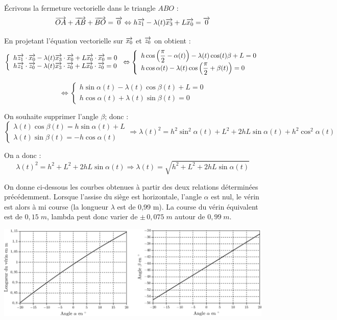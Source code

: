 \documentclass[10pt]{article}
\begin{document}
\begin{corrige}
Écrivons la fermeture vectorielle dans le triangle $ABO$ :
$$
\overrightarrow{OA} + \overrightarrow{AB} + \overrightarrow{BO} = \overrightarrow{0}  \Leftrightarrow  
h\overrightarrow{z_1} - \lambda(t) \overrightarrow{x_3} + L\overrightarrow{x_0} = \overrightarrow{0}
$$

En projetant l'équation vectorielle sur $\overrightarrow{x_0}$ et $\overrightarrow{z_0}$ on obtient : 
$$
\left\{
\begin{array}{l}
h\overrightarrow{z_1}\cdot\overrightarrow{x_0} - \lambda(t) \overrightarrow{x_3}\cdot\overrightarrow{x_0} + L\overrightarrow{x_0}\cdot\overrightarrow{x_0} = 0 \\
h\overrightarrow{z_1}\cdot\overrightarrow{z_0} - \lambda(t) \overrightarrow{x_3}\cdot\overrightarrow{z_0} + L\overrightarrow{x_0}\cdot\overrightarrow{z_0} = 0
\end{array}
\right.
\Leftrightarrow
\left\{
\begin{array}{l}
h\cos\left(\dfrac{\pi}{2} - \alpha(t)\right) - \lambda(t) \cos(t)\beta + L = 0 \\
h\cos\alpha(t) - \lambda(t) \cos\left(\dfrac{\pi}{2} + \beta(t)\right)  = 0
\end{array}
\right.
$$

$$
\Leftrightarrow
\left\{
\begin{array}{l}
h\sin \alpha(t) - \lambda(t) \cos\beta(t) + L = 0 \\
h\cos\alpha(t) + \lambda(t) \sin\beta(t)  = 0
\end{array}
\right.
$$

On souhaite supprimer l'angle $\beta$; donc :
$$
\left\{
\begin{array}{l}
\lambda(t) \cos\beta(t) = h\sin \alpha(t)  + L \\
\lambda(t) \sin\beta(t)  = - h\cos\alpha(t) 
\end{array}
\right.
\Longrightarrow
\lambda(t)^2 = h^2 \sin^2 \alpha(t) + L^2 + 2 h L \sin\alpha(t) + h^2 \cos^2\alpha(t)
$$

On a donc : 
$$
\lambda(t)^2 = h^2 + L^2 + 2 h L \sin\alpha(t)  \Longrightarrow
\lambda(t) = \sqrt{h^2 + L^2 + 2 h L \sin\alpha(t)}
$$
\end{corrige}
On donne ci-dessous les courbes obtenues à partir des deux relations
déterminées précédemment. Lorsque l’assise du siège est horizontale, l’angle $\alpha$ est nul, le vérin
est alors à mi course (la longueur $\lambda$ est de 0,99 m). La course du vérin équivalent est de $0,15\; m$,
lambda peut donc varier de $\pm\, 0,075\;m$ autour de $0,99\; m$.


\begin{center}
\includegraphics[width=.8\textwidth]{images/Simulateur5}
\end{center}
\end{document}
